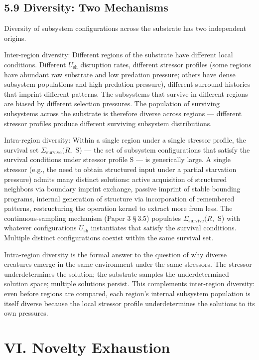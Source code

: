\documentclass[11pt,oneside]{report}
\theoremstyle{definition}
\theoremstyle{remark}
\begin{document}
\subsection*{5.9 Diversity: Two Mechanisms}

Diversity of subsystem configurations across the substrate has two
independent origins.

Inter-region diversity: Different regions of the substrate have
different local conditions. Different \ensuremath{U_{\mathrm{sh}}} disruption rates, different
stressor profiles (some regions have abundant raw substrate and low
predation pressure; others have dense subsystem populations and high
predation pressure), different surround histories that imprint different
patterns. The subsystems that survive in different regions are biased by
different selection pressures. The population of surviving subsystems
across the substrate is therefore diverse across regions --- different
stressor profiles produce different surviving subsystem distributions.

Intra-region diversity: Within a single region under a single stressor
profile, the survival set \ensuremath{\Sigma_{\mathrm{survive}}(R,} S) --- the set of subsystem
configurations that satisfy the survival conditions under stressor
profile S --- is generically large. A single stressor (e.g., the need to
obtain structured input under a partial starvation pressure) admits many
distinct solutions: active acquisition of structured neighbors via
boundary imprint exchange, passive imprint of stable bounding programs,
internal generation of structure via incorporation of remembered
patterns, restructuring the operation kernel to extract more from less.
The continuous-sampling mechanism (Paper 3 \S\,3.5) populates \ensuremath{\Sigma_{\mathrm{survive}}(R,}
S) with whatever configurations \ensuremath{U_{\mathrm{sh}}} instantiates that satisfy the
survival conditions. Multiple distinct configurations coexist within the
same survival set.

Intra-region diversity is the formal answer to the question of why
diverse creatures emerge in the same environment under the same
stressors. The stressor underdetermines the solution; the substrate
samples the underdetermined solution space; multiple solutions persist.
This complements inter-region diversity: even before regions are
compared, each region's internal subsystem population is itself diverse
because the local stressor profile underdetermines the solutions to its
own pressures.

\section*{VI. Novelty Exhaustion}
\end{document}
